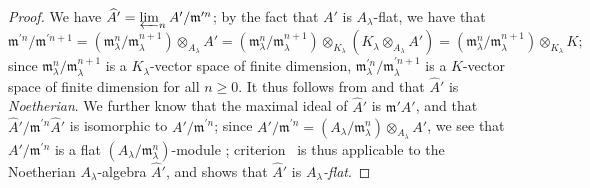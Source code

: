 \begin{proof}
We have $\widehat{A}'=\varprojlim_n A'/\mathfrak{m}^{\prime n}$;
by the fact that $A'$ is $A_\lambda$-flat, we have that
\[
  \mathfrak{m}^{\prime n}/\mathfrak{m}^{\prime n+1}=(\mathfrak{m}_\lambda^{n}/\mathfrak{m}_\lambda^{n+1})\otimes_{A_\lambda}A'=(\mathfrak{m}_\lambda^{n}/\mathfrak{m}_\lambda^{n+1})\otimes_{K_\lambda}(K_\lambda\otimes_{A_\lambda}A')=(\mathfrak{m}_\lambda^{n}/\mathfrak{m}_\lambda^{n+1})\otimes_{K_\lambda}K;
\]
since $\mathfrak{m}_\lambda^{n}/\mathfrak{m}_\lambda^{n+1}$ is a $K_\lambda$-vector space of finite dimension, $\mathfrak{m}_\lambda^{\prime n}/\mathfrak{m}_\lambda^{\prime n+1}$ is a $K$-vector space of finite dimension for all $n\geq 0$.
It thus follows from  and  that $\widehat{A}'$ is \emph{Noetherian}.
We further know that the maximal ideal of $\widehat{A}'$ is $\mathfrak{m}'A'$, and that $\widehat{A}'/\mathfrak{m}^{\prime n}\widehat{A}'$ is isomorphic to $A'/\mathfrak{m}^{\prime n}$;
since $A'/\mathfrak{m}^{\prime n}=(A_\lambda/\mathfrak{m}_\lambda^n)\otimes_{A_\lambda}A'$, we see that $A'/\mathfrak{m}^{\prime n}$ is a flat $(A_\lambda/\mathfrak{m}_\lambda^n)$-module ;
criterion~ is thus applicable to the Noetherian $A_\lambda$-algebra $\widehat{A}'$, and shows that $\widehat{A}'$ is \emph{$A_\lambda$-flat}.
\end{proof}


